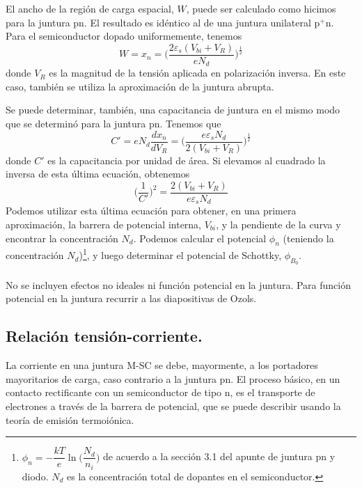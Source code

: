 \documentclass[12pt,a4paper]{article}
\begin{document}
El ancho de la región de carga espacial, $W$, puede ser calculado como hicimos para la juntura pn. El resultado es idéntico al de una juntura unilateral p$^{+}$n. Para el semiconductor dopado uniformemente, tenemos
\[ W=x_{n}=\bigg( \frac{2 \varepsilon _{s} (V_{bi}+V_{R})}{eN_{d}} \bigg)^{\frac{1}{2}} \]
donde $V_{R}$ es la magnitud de la tensión aplicada en polarización inversa. En este caso, también se utiliza la aproximación de la juntura abrupta.

Se puede determinar, también, una capacitancia de juntura en el mismo modo que se determinó para la juntura pn. Tenemos que
\[ C'=eN_{d} \frac{dx_{n}}{dV_{R}}=\bigg( \frac{e \varepsilon _{s} N_{d}}{2 (V_{bi}+V_{R})} \bigg)^{\frac{1}{2}} \]
donde $C'$ es la capacitancia por unidad de área. Si elevamos al cuadrado la inversa de esta última ecuación, obtenemos
\[ \bigg( \frac{1}{C'} \bigg)^{2}=\frac{2(V_{bi}+V_{R})}{e \varepsilon _{s} N_{d}} \]
Podemos utilizar esta última ecuación para obtener, en una primera aproximación, la barrera de potencial interna, $V_{bi}$, y la pendiente de la curva y encontrar la concentración $N_{d}$. Podemos calcular el potencial $\phi _{n}$ (teniendo la concentración $N_{d}$)\footnote{$\phi _{n}=-\dfrac{kT}{e} \ln \bigg( \dfrac{N_{d}}{n_{i}} \bigg)$ de acuerdo a la sección 3.1 del apunte de juntura pn y diodo. $N_{d}$ es la concentración total de dopantes en el semiconductor.}, y luego determinar el potencial de Schottky, $\phi _{B_{0}}$.

\paragraph{}

\scriptsize No se incluyen efectos no ideales ni función potencial en la juntura. Para función potencial en la juntura recurrir a las diapositivas de Ozols.

\normalsize

\subsection{Relación tensión-corriente.}

La corriente en una juntura M-SC se debe, mayormente, a los portadores mayoritarios de carga, caso contrario a la juntura pn. El proceso básico, en un contacto rectificante con un semiconductor de tipo n, es el transporte de electrones a través de la barrera de potencial, que se puede describir usando la teoría de emisión termoiónica.
\end{document}
